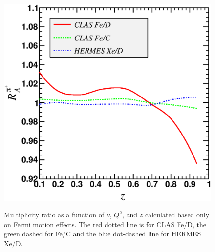 \begin{figure}[t]
{\includegraphics{fig/Ratio_FM_Z.eps} }
\caption {Multiplicity ratio as a function of $\nu$, $Q^2$, and $z$ calculated based only on Fermi motion effects. The red dotted line is for CLAS Fe/D, the green dashed for Fe/C and the blue dot-dashed line for HERMES Xe/D.}
\label{fig:FM-R}
\end{figure}

